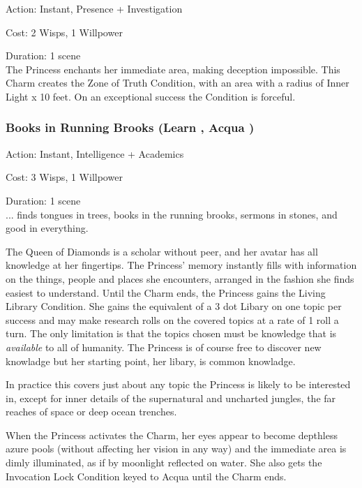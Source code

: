 \noindent Action: Instant, Presence + Investigation

\noindent Cost: 2 Wisps, 1 Willpower

\noindent Duration: 1 scene \\

\noindent The Princess enchants her immediate area, making deception impossible. This Charm creates the Zone of Truth Condition, with an area with a radius of Inner Light x 10 feet. On an exceptional success the Condition is forceful. 

\subsubsection*{Books in Running Brooks (Learn \textbullet\textbullet\textbullet\textbullet\textbullet, Acqua \textbullet\textbullet\textbullet\textbullet)}

\noindent Action: Instant, Intelligence + Academics

\noindent Cost: 3 Wisps, 1 Willpower

\noindent Duration: 1 scene \\

\noindent ... finds tongues in trees, books in the running brooks, sermons in stones, and good in everything.

The Queen of Diamonds is a scholar without peer, and her avatar has all knowledge at her fingertips. The Princess' memory instantly fills with information on the things, people and places she encounters, arranged in the fashion she finds easiest to understand. Until the Charm ends, the Princess gains the Living Library Condition. She gains the equivalent of a 3 dot Libary on one topic per success and may make research rolls on the covered topics at a rate of 1 roll a turn. The only limitation is that the topics chosen must be knowledge that is \textit{available} to all of humanity. The Princess is of course free to discover new knowladge but her starting point, her libary, is common knowladge. 

In practice this covers just about any topic the Princess is likely to be interested in, except for inner details of the supernatural and uncharted jungles, the far reaches of space or deep ocean trenches. 

When the Princess activates the Charm, her eyes appear to become depthless azure pools (without affecting her vision in any way) and the immediate area is dimly illuminated, as if by moonlight reflected on water. She also gets the Invocation Lock Condition keyed to Acqua until the Charm ends.

